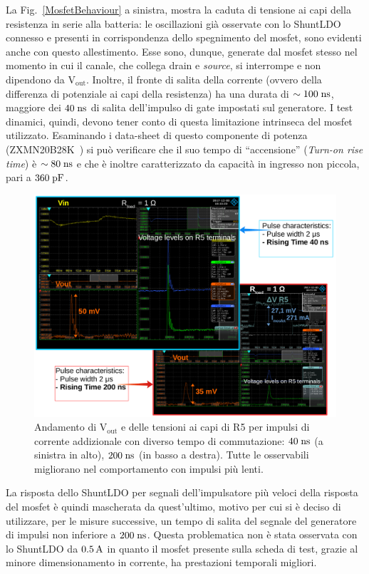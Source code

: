 La Fig.~\ref{MosfetBehaviour} a sinistra, mostra la caduta di tensione ai capi della resistenza in serie alla batteria: le oscillazioni già osservate con lo ShuntLDO connesso e presenti in corrispondenza dello spegnimento del mosfet, sono evidenti anche con questo allestimento.
Esse sono, dunque, generate dal mosfet stesso nel momento in cui il canale, che collega drain e \textit{source}, si interrompe e non dipendono da $\mathrm{V_{out}}$.
Inoltre, il fronte di salita della corrente (ovvero della differenza di potenziale ai capi della resistenza) ha una durata di $\sim 100 \rm \; ns$, maggiore dei $40\rm \; ns$ di salita dell'impulso di gate impostati sul generatore. I test dinamici, quindi, devono tener conto di questa limitazione intrinseca del mosfet utilizzato. Esaminando i data-sheet di questo componente di potenza (ZXMN20B28K~\cite{MOSFET}) si può verificare che il suo tempo di ``accensione'' (\textit{Turn-on rise time}) è $\sim 80 \rm \; ns$ e che \`e inoltre caratterizzato da capacità in ingresso non piccola, pari a $360\rm \; pF$.
\begin{figure}
\centering
\includegraphics[width=\linewidth]{Immagini/RiseTime}
\caption{Andamento di $\mathrm{V_{out}}$ e delle tensioni ai capi di R5 per impulsi di corrente addizionale con diverso tempo di commutazione: $40\rm \; ns$ (a sinistra in alto), $200\rm \; ns$ (in basso a destra). Tutte le osservabili migliorano nel comportamento con impulsi pi\`u lenti.}
\label{RiseTime}
\end{figure}

La risposta dello ShuntLDO per segnali dell'impulsatore più veloci della risposta del mosfet è quindi mascherata da quest'ultimo, motivo per cui si è deciso di utilizzare, per le misure successive, un tempo di salita del segnale del generatore di impulsi non inferiore a $200\rm \; ns$. Questa problematica non \`e stata osservata con lo ShuntLDO da $0.5\rm \, A$ in quanto il mosfet presente sulla scheda di test, grazie al minore dimensionamento in corrente, ha prestazioni temporali migliori.

